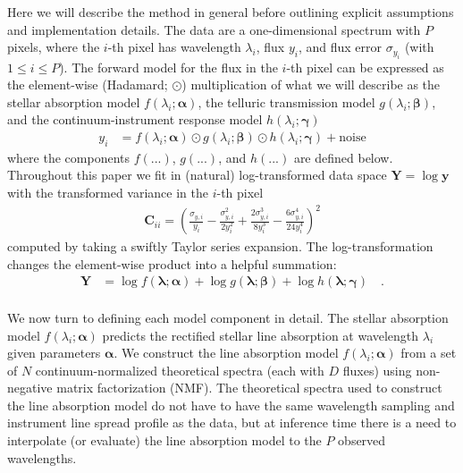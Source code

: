 \documentclass[modern]{aastex631}
\renewcommand{\vec}[1]{\mathbf{#1}}
\newcommand{\vecalpha}{\boldsymbol{\alpha}}
\newcommand{\vecbeta}{\boldsymbol{\beta}}
\newcommand{\vecgamma}{\boldsymbol{\gamma}}
\newcommand{\hadamard}{\odot}
\begin{document}
Here we will describe the method in general before outlining explicit assumptions and implementation details. The data are a one-dimensional spectrum with $P$ pixels, where the $i$-th pixel has wavelength $\lambda_i$, flux $y_i$, and flux error $\sigma_{y_i}$ (with $1 \leq i \leq P$). The forward model for the flux in the $i$-th pixel can be expressed as the element-wise (Hadamard; $\hadamard$) multiplication of what we will describe as the stellar absorption model $f(\lambda_i; \vecalpha)$, the telluric transmission model $g(\lambda_i; \vecbeta)$, and the continuum-instrument response model $h(\lambda_i;\vecgamma)$
\begin{align}
    y_i &= f(\lambda_i;\vecalpha)\hadamard{}g(\lambda_i;\vecbeta)\hadamard{}h(\lambda_i;\vecgamma) + \mbox{noise}
\end{align}
where the components $f(...)$, $g(...)$, and $h(...)$ are defined below. Throughout this paper we fit in (natural) log-transformed data space $\vec{Y} = \log{\vec{y}}$ with the transformed variance in the $i$-th pixel
\begin{eqnarray}
    \vec{C}_{ii} = \left(\frac{\sigma_{y,i}}{y_i} - \frac{\sigma_{y,i}^2}{2y_i^2} + \frac{2\sigma_{y,i}^3}{8y_i^3} - \frac{6\sigma_{y,i}^4}{24y_i^4}\right)^2
\end{eqnarray}
\noindent{}computed by taking a swiftly Taylor series expansion. The log-transformation changes the element-wise product into a helpful summation:
\begin{align}
    \label{eq:log_y}
    \vec{Y} &= \log{f(\vec{\lambda}; \vecalpha)} + \log{g(\vec{\lambda};\vecbeta)} + \log{h(\vec{\lambda};\vecgamma)} \quad .
\end{align}\\

We now turn to defining each model component in detail.
The stellar absorption model $f(\lambda_i;\vecalpha)$ predicts the rectified stellar line absorption at wavelength $\lambda_i$ given parameters $\vecalpha$. We construct the line absorption model $f(\lambda_i;\vecalpha)$ from a set of $N$ continuum-normalized theoretical spectra (each with $D$ fluxes) using non-negative matrix factorization (NMF).
The theoretical spectra used to construct the line absorption model do not have to have the same wavelength sampling and instrument line spread profile as the data, but at inference time there is a need to interpolate (or evaluate) the line absorption model to the $P$ observed wavelengths.\\
\end{document}
